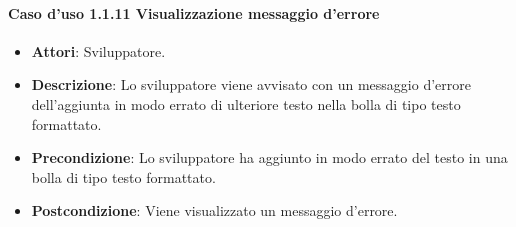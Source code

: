 \paragraph{Caso d'uso 1.1.11 Visualizzazione messaggio d'errore}
\begin{itemize}
\item\textbf{Attori}: Sviluppatore.
\item\textbf{Descrizione}: Lo sviluppatore viene avvisato con un messaggio d'errore dell'aggiunta in modo errato di ulteriore testo nella bolla di tipo testo formattato.
\item\textbf{Precondizione}: Lo sviluppatore ha aggiunto in modo errato del testo in una bolla di tipo testo formattato.
\item\textbf{Postcondizione}: Viene visualizzato un messaggio d'errore.
\end{itemize}